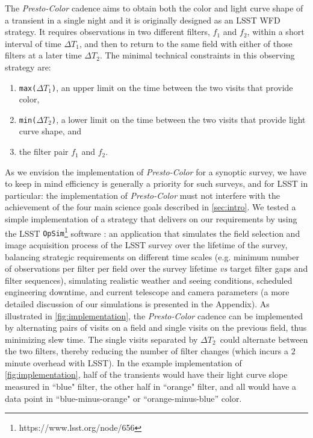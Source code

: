 \documentclass[letterpaper,longauthor,trackchanges,twocolumn,onecolappendix,sort&compress]{aastex62}
\newcommand{\dtone}{\ensuremath{\Delta T_1}}
\newcommand{\dttwo}{\ensuremath{\Delta T_2}}
\begin{document}
The {\em Presto-Color} cadence aims to obtain both the color and light curve shape of a transient in a single night and it is originally designed as an LSST WFD strategy. It requires observations in two different filters, $f_1$ and $f_2$, within a short interval of time \dtone, and then to return to the same field with either of those filters at a later time \dttwo. The minimal technical constraints in this observing strategy are:
\begin{enumerate}
    \item {\tt max(\dtone)}, an upper limit on the time between the two visits that provide color,
    \item {\tt min(\dttwo)}, a lower limit on the time between the two visits that provide light curve shape, and
    \item the filter pair $f_1$ and $f_2$.
\end{enumerate}

As we envision the implementation of {\em Presto-Color} for a synoptic survey, we have to keep in mind efficiency is generally a priority for such surveys, and for LSST in particular: the implementation of {\em Presto-Color} must not interfere with the achievement of the four main science goals described in \autoref{sec:intro}. We tested a simple implementation of a strategy that delivers on our requirements by using the LSST {\tt OpSim}\footnote{https://www.lsst.org/node/656} software \citep{opsim}: an application that simulates the field selection and image acquisition process of the LSST survey over the lifetime of the survey, balancing  strategic requirements on different time scales (e.g. minimum number of observations per filter per field over the survey lifetime \emph{vs} target filter gaps and filter sequences), simulating realistic weather and seeing conditions, scheduled engineering downtime, and current telescope and camera parameters (a more detailed discussion of our simulations is presented in the Appendix). As illustrated in \autoref{fig:implementation}, the {\em Presto-Color} cadence can be implemented by alternating pairs of visits on a field and single visits on the previous field, thus minimizing slew time. The single visits separated by \dttwo\ could alternate between the two filters, thereby reducing the number of filter changes (which incurs a $2$ minute overhead with LSST). In the example implementation of \autoref{fig:implementation}, half of the transients would have their light curve slope measured in ``blue" filter, the other half in ``orange" filter, and all would have a data point in ``blue-minus-orange" or ``orange-minus-blue'' color. 
\end{document}
